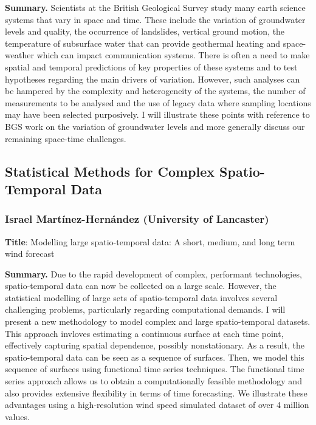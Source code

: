 \documentclass[
  11pt,
  letterpaper,
  DIV=11,
  numbers=noendperiod]{scrartcl}
\begin{document}
\textbf{Summary.} Scientists at the British Geological Survey study many
earth science systems that vary in space and time. These include the
variation of groundwater levels and quality, the occurrence of
landslides, vertical ground motion, the temperature of subsurface water
that can provide geothermal heating and space-weather which can impact
communication systems. There is often a need to make spatial and
temporal predictions of key properties of these systems and to test
hypotheses regarding the main drivers of variation. However, such
analyses can be hampered by the complexity and heterogeneity of the
systems, the number of measurements to be analysed and the use of legacy
data where sampling locations may have been selected purposively. I will
illustrate these points with reference to BGS work on the variation of
groundwater levels and more generally discuss our remaining space-time
challenges.

\subsection{Statistical Methods for Complex Spatio-Temporal
Data}\label{statistical-methods-for-complex-spatio-temporal-data}

\subsubsection[\textbf{Israel Martínez-Hernández} (University of Lancaster) \\Modelling large spatio-temporal data: A short, medium, and long term wind forecast]{
Israel Martínez-Hernández (University of Lancaster)}

\textbf{Title}: Modelling large spatio-temporal data: A short, medium,
and long term wind forecast

\textbf{Summary.} Due to the rapid development of complex, performant
technologies, spatio-temporal data can now be collected on a large
scale. However, the statistical modelling of large sets of
spatio-temporal data involves several challenging problems, particularly
regarding computational demands. I will present a new methodology to
model complex and large spatio-temporal datasets. This approach invloves
estimating a continuous surface at each time point, effectively
capturing spatial dependence, possibly nonstationary. As a result, the
spatio-temporal data can be seen as a sequence of surfaces. Then, we
model this sequence of surfaces using functional time series techniques.
The functional time series approach allows us to obtain a
computationally feasible methodology and also provides extensive
flexibility in terms of time forecasting. We illustrate these advantages
using a high-resolution wind speed simulated dataset of over 4 million
values.
\end{document}
